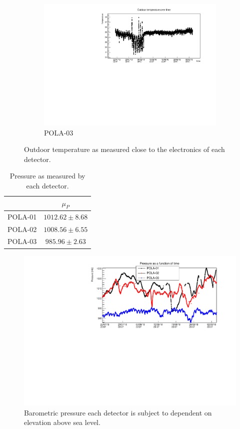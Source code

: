 \documentclass[12pt,a4paper]{amsart}
\begin{document}
\begin{figure}
\begin{subfigure}[b]{0.6\textwidth}
		\includegraphics[width=\textwidth]{../data/plots/POLA-03/OutdoorTemp_POLA-03.pdf}
		\caption{POLA-03}
		\label{fig:outdoortemp_POLA-03}
	\end{subfigure}
	\caption{Outdoor temperature as measured close to the electronics of each detector.}
	\label{fig:outdoortemp}
\end{figure}

\begin{table}[t]
\caption{Pressure as measured by each detector.}
\label{tab_pressure}
\begin{tabular}{c|c}
\hline\hline
        & $\mu_P$           \\ \hline
POLA-01 & $1012.62\pm 8.68$ \\
POLA-02 & $1008.56\pm 6.55$ \\
POLA-03 & $985.96\pm2.63$   \\
\hline \hline
\end{tabular}
\end{table}

\begin{figure}
	\centering
	\includegraphics[width=\textwidth]{../data/plots/pressure_all.pdf}
	\caption{Barometric pressure each detector is subject to dependent on elevation above sea level.}
	\label{fig:pressure}
\end{figure}
\end{document}
